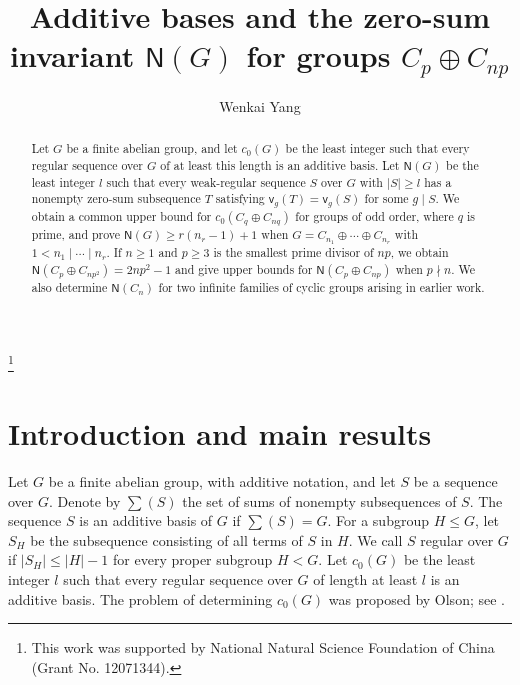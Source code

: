 \documentclass[10pt,reqno]{amsart}
\theoremstyle{definition}
\theoremstyle{remark}
\numberwithin{equation}{section}
\begin{document}
\title[Zero-sum sequences and additive bases]{Additive bases and the zero-sum invariant $\mathsf{N}(G)$ for groups $C_p\oplus C_{np}$}

\author[W.K. Yang]{Wenkai Yang}
\address{Center for Combinatorics, Nankai University, Tianjin 300071, P.R. China}

\thanks{This work was supported by
National Natural Science Foundation of China (Grant No. 12071344).}

\begin{abstract}
Let $G$ be a finite abelian group, and let $c_0(G)$ be the least integer
such that every regular sequence over $G$ of at least this length is an
additive basis. Let $\mathsf N(G)$ be the least integer $l$ such that every
weak-regular sequence $S$ over $G$ with $|S|\ge l$ has a nonempty zero-sum
subsequence $T$ satisfying $\mathsf v_g(T)=\mathsf v_g(S)$ for some $g\mid S$.
We obtain a common upper bound for $c_0(C_q\oplus C_{nq})$ for groups
of odd order, where $q$ is prime, and prove $\mathsf N(G)\ge r(n_r-1)+1$ when
$G=C_{n_1}\oplus\cdots\oplus C_{n_r}$ with $1<n_1\mid\cdots\mid n_r$.
If $n\ge1$ and $p\ge3$ is the smallest prime divisor of $np$, we obtain
$\mathsf N(C_p\oplus C_{np^2})=2np^2-1$ and give upper bounds for
$\mathsf N(C_p\oplus C_{np})$ when $p\nmid n$.
We also determine $\mathsf N(C_n)$ for two infinite families of cyclic
groups arising in earlier work.
\end{abstract}

\maketitle

\section{Introduction and main results}

Let $G$ be a finite abelian group, with additive notation, and let $S$ be
a sequence over $G$. Denote by $\sum(S)$ the set of sums of nonempty
subsequences of $S$. The sequence $S$ is an additive basis of $G$ if
$\sum(S)=G$. For a subgroup $H\le G$, let $S_H$ be the subsequence
consisting of all terms of $S$ in $H$. We call $S$ regular over $G$ if
$|S_H|\le |H|-1$ for every proper subgroup $H<G$.
Let $c_0(G)$ be the least integer $l$ such that every regular sequence
over $G$ of length at least $l$ is an additive basis.
The problem of determining $c_0(G)$ was proposed by Olson;
see \cite{[GHQQZ2015],[GQZ2020]}.
\end{document}
